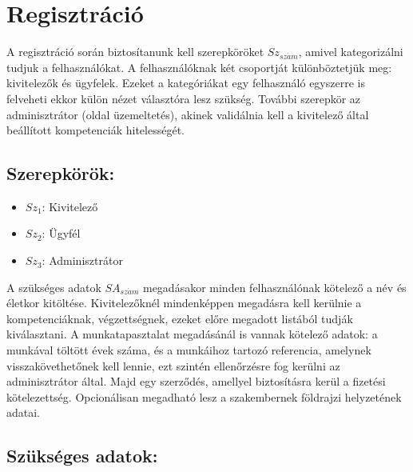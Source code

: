 \section{Regisztráció}


A regisztráció során biztosítanunk kell szerepköröket ${Sz}_{sz\acute{a}m}$, amivel kategorizálni tudjuk a felhasználókat. A felhasználóknak két csoportját különböztetjük meg: kivitelezők és ügyfelek. Ezeket a kategóriákat egy felhasználó egyszerre is felveheti ekkor külön nézet választóra lesz szükség. További szerepkör az adminisztrátor (oldal üzemeltetés), akinek validálnia kell a kivitelező által beállított kompetenciák hitelességét.

\subsection{Szerepkörök:}

\begin{itemize}
    \item ${Sz}_1$: Kivitelező
    \item ${Sz}_2$: Ügyfél
    \item ${Sz}_3$: Adminisztrátor
\end{itemize}

A szükséges adatok ${SA}_{sz\acute{a}m}$ megadásakor minden felhasználónak kötelező a név és életkor kitöltése. Kivitelezőknél mindenképpen megadásra kell kerülnie a kompetenciáknak, végzettségnek, ezeket előre megadott listából tudják kiválasztani. A munkatapasztalat megadásánál is vannak kötelező adatok: a munkával töltött évek száma, és a munkáihoz tartozó referencia, amelynek visszakövethetőnek kell lennie, ezt szintén ellenőrzésre fog kerülni az adminisztrátor által. Majd egy szerződés, amellyel biztosításra kerül a fizetési kötelezettség. Opcionálisan megadható lesz a szakembernek földrajzi helyzetének adatai.

\subsection{Szükséges adatok:}

